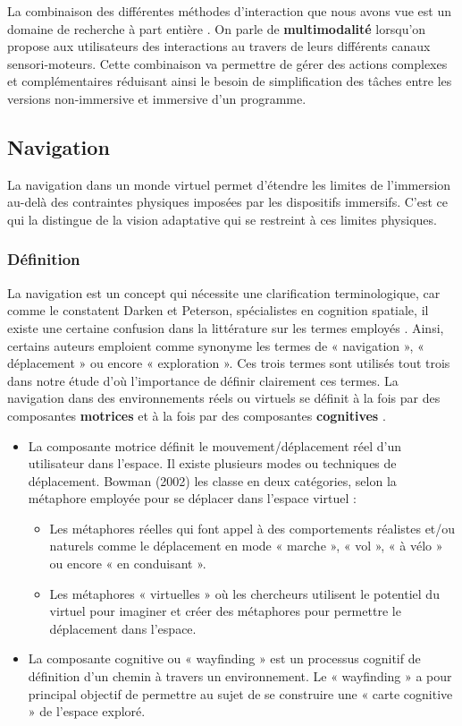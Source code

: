 La combinaison des différentes méthodes d'interaction que nous avons vue est un domaine de recherche à part entière \cite{martin_hardware_2014,martin_reconfigurable_2011}. On parle de \textbf{multimodalité} lorsqu'on propose aux utilisateurs des interactions au travers de leurs différents canaux sensori-moteurs. Cette combinaison va permettre de gérer des actions complexes et complémentaires réduisant ainsi le besoin de simplification des tâches entre les versions non-immersive et immersive d'un programme.

\subsection{Navigation} \label{navigation}

La navigation dans un monde virtuel permet d'étendre les limites de l'immersion au-delà des contraintes physiques imposées par les dispositifs immersifs. C'est ce qui la distingue de la vision adaptative qui se restreint à ces limites physiques. 

\subsubsection{Définition}

La navigation est un concept qui nécessite une clarification terminologique, car comme le constatent Darken et Peterson, spécialistes en cognition spatiale, il existe une certaine confusion dans la littérature sur les termes employés \cite{darken2002spatial}. Ainsi, certains auteurs emploient comme synonyme les termes de « navigation », « déplacement » ou encore « exploration ». Ces trois termes sont utilisés tout trois dans notre étude d’où l’importance de définir clairement ces termes. La navigation dans des environnements réels ou virtuels se définit à la fois par des composantes \textbf{motrices} et à la fois par des composantes \textbf{cognitives} \cite{bowman_doug_a_3d_2002}.

\begin{itemize}
  \item La composante motrice définit le mouvement/déplacement réel d’un utilisateur dans l’espace. Il existe plusieurs modes ou techniques de déplacement. Bowman (2002) les classe en deux catégories, selon la métaphore employée pour se déplacer dans l’espace virtuel :
    \begin{itemize}
      \item Les métaphores réelles qui font appel à des comportements réalistes et/ou naturels comme le déplacement en mode « marche », « vol », « à vélo » ou encore « en conduisant ».
      \item Les métaphores « virtuelles » où les chercheurs utilisent le potentiel du virtuel pour imaginer et créer des métaphores pour permettre le déplacement dans l’espace.
    \end{itemize}
  \item La composante cognitive ou « wayfinding » est un processus cognitif de définition d’un chemin à travers un environnement. Le « wayfinding » a pour principal objectif de permettre au sujet de se construire une « carte cognitive » de l’espace exploré.
\end{itemize}

